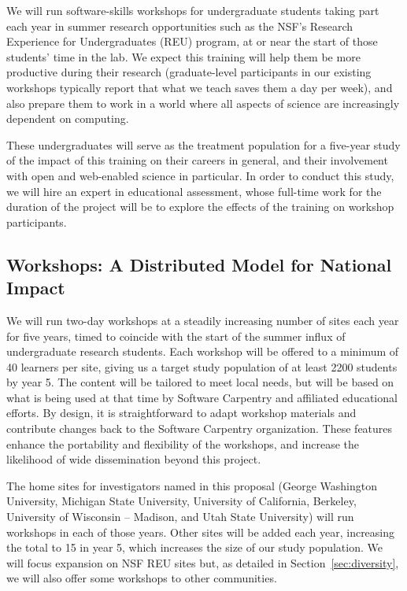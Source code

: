 \documentclass{proposalnsf}
\begin{document}
We will run software-skills workshops for undergraduate students
taking part each year in summer research opportunities such as the
NSF's Research Experience for Undergraduates (REU) program, at or near
the start of those students' time in the lab.  We expect this training
will help them be more productive during their research (graduate-level
participants in our existing workshops typically report that what we
teach saves them a day per week), and also prepare them to work in a
world where all aspects of science are increasingly dependent on
computing.

These undergraduates will serve as the treatment population for a
five-year study of the impact of this training on their careers in
general, and their involvement with open and web-enabled science in
particular.  In order to conduct this study, we will hire an expert in
educational assessment, whose full-time work for the duration of the
project will be to explore the effects of the training on workshop
participants.

\subsection{Workshops: A Distributed Model for National Impact}

We will run two-day workshops at a steadily increasing number of sites
each year for five years, timed to coincide with the start of the
summer influx of undergraduate research students.  Each workshop will
be offered to a minimum of 40 learners per site, giving us a target
study population of at least 2200 students by year 5.  The content will be
tailored to meet local needs, but will be based on what is being used
at that time by Software Carpentry and affiliated educational efforts.
By design, it is straightforward to adapt workshop materials and
contribute changes back to the Software Carpentry organization.  These
features enhance the portability and flexibility of the workshops, and
increase the likelihood of wide dissemination beyond this project.

The home sites for investigators named in this proposal (George
Washington University, Michigan State University, University of
California, Berkeley, University of Wisconsin -- Madison, and
Utah State University) will run workshops in each of those years.
Other sites will be added each year, increasing the total to 15 in
year 5, which increases the size of our study population.  We will
focus expansion on NSF REU sites \cite{nsfreu} but, as detailed in
Section~\ref{sec:diversity}, we will also offer some workshops to
other communities.
\end{document}

